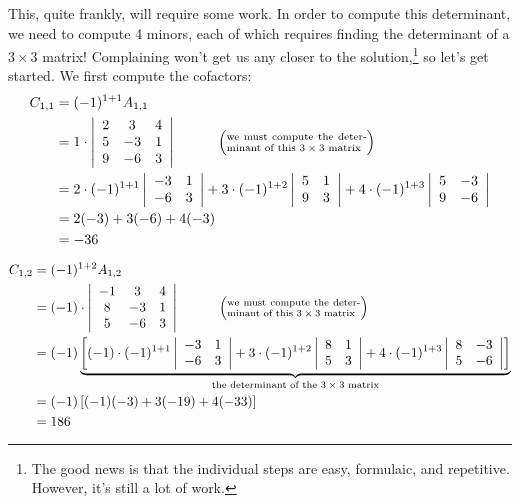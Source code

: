 {This, quite frankly, will require some work. In order to compute this determinant, we need to compute 4 minors, each of which requires finding the determinant of a $3\times 3$ matrix! Complaining won't get us any closer to the solution,\footnote{The good news is that the individual steps are easy, formulaic, and repetitive. However, it's still a lot of work.} so let's get started. We first compute the cofactors:
\begin{align*}C_{1,1} &= (-1)^{1+1}\tta_{1,1}\\
	&= 1\cdot\bdt{ccc}2&3&4\\5&-3&1\\9&-6&3\edt \quad\quad\quad \left(\parbox{100pt}{\scriptsize we must compute the determinant of this $3\times 3$ matrix}\right)\\
	&= 2\cdot(-1)^{1+1}\bdt{cc}-3&1\\-6&3\edt + 3\cdot(-1)^{1+2}\bdt{cc}5&1\\9&3\edt + 4\cdot(-1)^{1+3}\bdt{cc}5&-3\\9&-6\edt \\
	&= 2(-3) + 3(-6) + 4(-3)\\
	&= -36
\end{align*}

\begin{align*}C_{1,2} &= (-1)^{1+2}\tta_{1,2}\\
	&= (-1)\cdot\bdt{ccc}-1&3&4\\8&-3&1\\5&-6&3\edt \quad\quad\quad \left(\parbox{100pt}{\scriptsize we must compute the determinant of this $3\times 3$ matrix}\right)\\
	&= (-1)\underbrace{\left[(-1)\cdot(-1)^{1+1}\bdt{cc}-3&1\\-6&3\edt + 3\cdot(-1)^{1+2}\bdt{cc}8&1\\5&3\edt + 4\cdot(-1)^{1+3}\bdt{cc}8&-3\\5&-6\edt \right]}_{\parbox{150pt}{\centering\scriptsize the determinant of the $3 \times 3$ matrix}} \\
	&= (-1)\left[(-1)(-3)+3(-19)+4(-33) \right]\\
	&= 186
\end{align*}

\drawexampleline%

}
